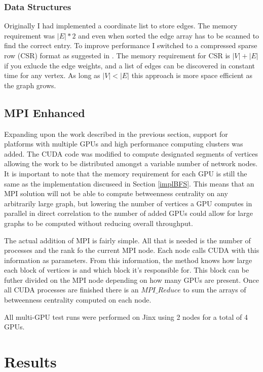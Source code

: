 \documentclass[10pt,twocolumn]{article}
\begin{document}
\subsubsection{Data Structures}
Originally I had implemented a coordinate list to store edges. The memory requirement was $|E| * 2$ and even when sorted the edge array has to be scanned to find the correct entry. To improve performance I switched to a compressed sparse row (CSR) format as suggested in \cite{Sariyuce}. The memory requirement for CSR is $|V| + |E|$ if you exlucde the edge weights, and a list of edges can be discovered in constant time for any vertex. As long as $|V| < |E|$ this approach is more space efficient as the graph grows.

\subsection{MPI Enhanced}
Expanding upon the work described in the previous section, support for platforms with multiple GPUs and high performance computing clusters was added. The CUDA code was modified to compute designated segments of vertices allowing the work to be distributed amongst a variable number of network nodes. It is important to note that the memory requirement for each GPU is still the same as the implementation discuseed in Section \ref{implBFS}. This means that an MPI solution will not be able to compute betweenness centrality on any arbitrarily large graph, but lowering the number of vertices a GPU computes in parallel in direct correlation to the number of added GPUs could allow for large graphs to be computed without reducing overall throughput.

The actual addition of MPI is fairly simple. All that is needed is the number of processes and the rank fo the current MPI node. Each node calls CUDA with this information as parameters. From this information, the method knows how large each block of vertices is and which block it's responsible for. This block can be futher divided on the MPI node depending on how many GPUs are present. Once all CUDA processes are finished there is an $MPI\_Reduce$ to sum the arrays of betweenness centrality computed on each node.

All multi-GPU test runs were performed on Jinx using 2 nodes for a total of 4 GPUs.

\section{Results}
\end{document}
